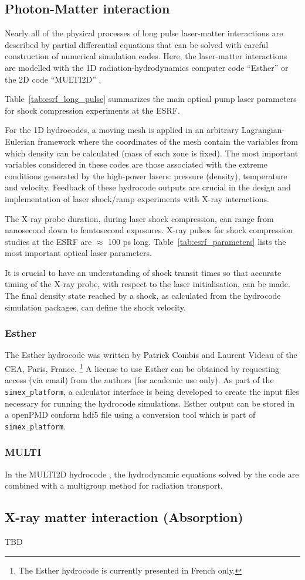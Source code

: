 \documentclass[a4paper]{article}
\begin{document}
\subsection{Photon-Matter interaction}
Nearly all of the physical processes of long pulse laser-matter interactions are described by partial differential
equations that can be solved with careful construction of numerical simulation codes. Here, the laser-matter
interactions are modelled with the 1D radiation-hydrodynamics computer code ``Esther'' \cite{Colombier2005}
or the 2D code ``MULTI2D'' \cite{Ramis2009}.

Table~\ref{tab:esrf_long_pulse} summarizes the main optical pump laser
parameters for shock compression experiments at the ESRF.

For the 1D hydrocodes, a moving mesh is applied in an arbitrary Lagrangian-Eulerian framework where the coordinates of
the mesh contain the variables from which density can be calculated (mass of
each zone is fixed). The most important variables
considered in these codes are those associated with the extreme conditions generated by the high-power lasers: pressure (density),
temperature and velocity. Feedback of these hydrocode outputs are crucial in the design and implementation of laser shock/ramp
experiments with X-ray interactions.

The X-ray probe duration, during laser shock compression, can range from nanosecond down to femtosecond exposures.
X-ray pulses for shock compression studies at the ESRF are $\approx$ 100 ps
long. Table~\ref{tab:esrf_parameters} lists the most important optical laser
parameters.

It is crucial to have an understanding of shock transit times so that accurate timing of the X-ray probe,
with respect to the laser initialisation, can be made. The final density state reached by a shock, as calculated
from the hydrocode simulation packages, can define the shock velocity.

\subsubsection{Esther}
The Esther hydrocode was written by Patrick Combis and Laurent Videau of the CEA, Paris, France.
\footnote{The Esther hydrocode is currently presented in French only.}
A license to use Esther can be obtained by requesting access (via email) from the authors (for academic use only).
As part of the \texttt{simex\_platform}, a calculator interface is being developed to create the input files necessary for running
the hydrocode simulations. Esther output can be stored in a openPMD conform hdf5
file using a conversion tool which is part of \texttt{simex\_platform}.

\subsubsection{MULTI}
In the MULTI2D hydrocode \cite{Ramis2009},
the hydrodynamic equations solved by the code are combined with a multigroup method for radiation transport.

\subsection{X-ray matter interaction (Absorption)}
TBD

\printbibliography
\end{document}
